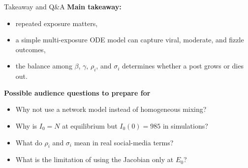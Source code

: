 \documentclass[aspectratio=169]{beamer}
\begin{document}
\begin{frame}{Takeaway and Q\&A}
  \textbf{Main takeaway:}
  \begin{itemize}
    \item repeated exposure matters,
    \item a simple multi-exposure ODE model can capture viral, moderate, and fizzle outcomes,
    \item the balance among $\beta$, $\gamma$, $\rho_i$, and $\sigma_i$ determines whether a post grows or dies out.
  \end{itemize}

  \vspace{0.8em}
  \textbf{Possible audience questions to prepare for}
  \begin{itemize}
    \item Why not use a network model instead of homogeneous mixing?
    \item Why is $I_0=N$ at equilibrium but $I_0(0)=985$ in simulations?
    \item What do $\rho_i$ and $\sigma_i$ mean in real social-media terms?
    \item What is the limitation of using the Jacobian only at $E_0$?
  \end{itemize}
\end{frame}
\end{document}
